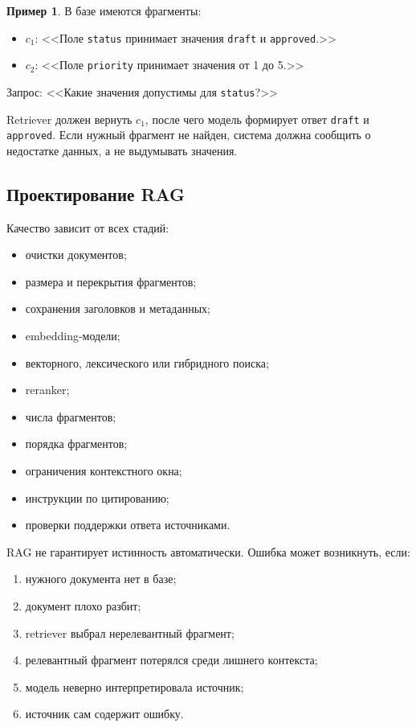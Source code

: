 \documentclass[12pt,a4paper]{article}
\newcommand{\1}{\mathbf{1}}
\theoremstyle{definition}
\newtheorem{example}[theorem]{Пример}
\theoremstyle{remark}
\begin{document}
\begin{example}
В базе имеются фрагменты:

\begin{itemize}
    \item $c_1$: <<Поле \texttt{status} принимает значения
    \texttt{draft} и \texttt{approved}.>>
    \item $c_2$: <<Поле \texttt{priority} принимает значения от 1 до 5.>>
\end{itemize}

Запрос: <<Какие значения допустимы для \texttt{status}?>>

Retriever должен вернуть $c_1$, после чего модель формирует ответ
\texttt{draft} и \texttt{approved}. Если нужный фрагмент не найден,
система должна сообщить о недостатке данных, а не выдумывать значения.
\end{example}

\subsection{Проектирование RAG}

Качество зависит от всех стадий:

\begin{itemize}
    \item очистки документов;
    \item размера и перекрытия фрагментов;
    \item сохранения заголовков и метаданных;
    \item embedding-модели;
    \item векторного, лексического или гибридного поиска;
    \item reranker;
    \item числа фрагментов;
    \item порядка фрагментов;
    \item ограничения контекстного окна;
    \item инструкции по цитированию;
    \item проверки поддержки ответа источниками.
\end{itemize}

RAG не гарантирует истинность автоматически. Ошибка может возникнуть,
если:

\begin{enumerate}
    \item нужного документа нет в базе;
    \item документ плохо разбит;
    \item retriever выбрал нерелевантный фрагмент;
    \item релевантный фрагмент потерялся среди лишнего контекста;
    \item модель неверно интерпретировала источник;
    \item источник сам содержит ошибку.
\end{enumerate}
\end{document}
